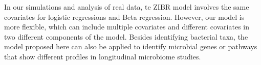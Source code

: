 In our simulations  and analysis of real data, te ZIBR model  involves the same covariates for logistic regressions and Beta regression.  However, our model is more flexible, which  can include  multiple   covariates and different covariates  in two different  components of the model.  Besides identifying bacterial taxa, the model proposed here can also be applied  to identify microbial genes or pathways that show different profiles  in longitudinal microbiome studies.
